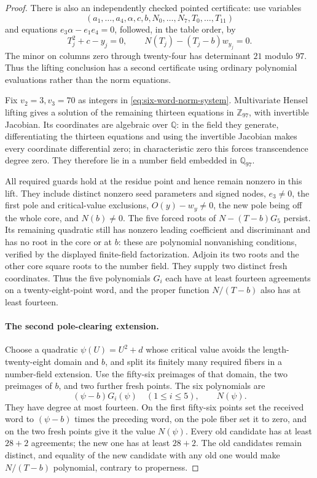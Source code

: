 \begin{proof}
There is also an independently checked pointed certificate: use variables
\[
 (a_1,\ldots,a_4,\alpha,c,b,N_0,\ldots,N_7,T_0,\ldots,T_{11})
\]
and equations $e_3\alpha-e_1e_4=0$, followed, in the table order, by
\[
 T_j^2+c-y_j=0,\qquad N(T_j)-(T_j-b)w_{y_j}=0.
\]
The minor on columns zero through twenty-four has determinant $21$
modulo $97$.  Thus the lifting conclusion has a second certificate using
ordinary polynomial evaluations rather than the norm equations.

Fix $v_2=3,v_3=70$ as integers in
\eqref{eq:six-word-norm-system}.  Multivariate Hensel lifting gives a
solution of the remaining thirteen equations in $\mathbb Z_{97}$, with
invertible Jacobian.  Its coordinates are algebraic over $\mathbb Q$:
in the field they generate, differentiating the thirteen equations and
using the invertible Jacobian makes every coordinate differential zero;
in characteristic zero this forces transcendence degree zero.
They therefore lie in a number field embedded in $\mathbb Q_{97}$.

All required guards hold at the residue point and hence remain nonzero
in this lift.  They include distinct nonzero seed parameters and signed
nodes, $e_3\ne0$, the first pole and critical-value exclusions,
$O(y)-w_y\ne0$, the new pole being off the whole core, and $N(b)\ne0$.
The five forced roots of $N-(T-b)G_5$ persist.  Its remaining quadratic
still has nonzero leading coefficient and discriminant and has no root
in the core or at $b$: these are polynomial nonvanishing conditions,
verified by the displayed finite-field factorization.
Adjoin its two roots and the other core square roots to the number field.
They supply two distinct fresh coordinates.  Thus the five polynomials
$G_i$ each have at least fourteen agreements on a twenty-eight-point word,
and the proper function $N/(T-b)$ also has at least fourteen.

\paragraph{The second pole-clearing extension.}
Choose a quadratic $\psi(U)=U^2+d$ whose critical value avoids the
length-twenty-eight domain and $b$, and split its finitely many required
fibers in a number-field extension.  Use the fifty-six preimages of that
domain, the two preimages of $b$, and two further fresh points.  The six
polynomials are
\[
 (\psi-b)G_i(\psi)\quad(1\le i\le5),\qquad N(\psi).
\]
They have degree at most fourteen.  On the first fifty-six points set
the received word to $(\psi-b)$ times the preceding word, on the pole
fiber set it to zero, and on the two fresh points give it the value
$N(\psi)$.  Every old candidate has at least $28+2$ agreements; the new
one has at least $28+2$.  The old candidates remain distinct, and equality
of the new candidate with any old one would make $N/(T-b)$ polynomial,
contrary to properness.


\end{proof}
